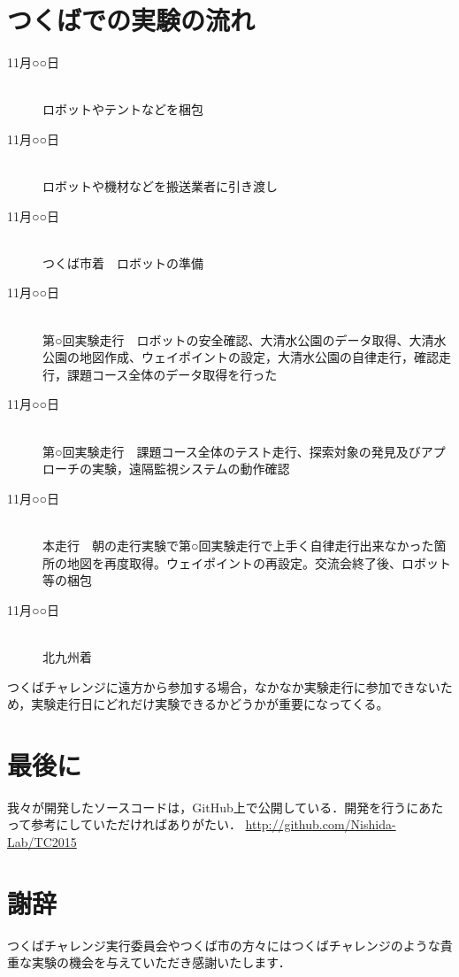\documentclass[10pt,a4paper]{jarticle}
\begin{document}
\section{つくばでの実験の流れ}
\begin{description}
 \item[11月○○日]\mbox{}\\
	    ロボットやテントなどを梱包
 \item[11月○○日]\mbox{}\\
	    ロボットや機材などを搬送業者に引き渡し
 \item[11月○○日]\mbox{}\\
	    つくば市着　ロボットの準備
 \item[11月○○日]\mbox{}\\
	    第○回実験走行　ロボットの安全確認、大清水公園のデータ取得、大清水公園の地図作成、ウェイポイントの設定，大清水公園の自律走行，確認走行，課題コース全体のデータ取得を行った
 \item[11月○○日]\mbox{}\\
	    第○回実験走行　課題コース全体のテスト走行、探索対象の発見及びアプローチの実験，遠隔監視システムの動作確認
 \item[11月○○日]\mbox{}\\
	    本走行　朝の走行実験で第○回実験走行で上手く自律走行出来なかった箇所の地図を再度取得。ウェイポイントの再設定。交流会終了後、ロボット等の梱包
 \item[11月○○日]\mbox{}\\
	    北九州着
\end{description}
つくばチャレンジに遠方から参加する場合，なかなか実験走行に参加できないため，実験走行日にどれだけ実験できるかどうかが重要になってくる。

\section{最後に}
我々が開発したソースコードは，GitHub上で公開している．開発を行うにあたって参考にしていただければありがたい．
\url{http://github.com/Nishida-Lab/TC2015}

\section*{謝辞}
つくばチャレンジ実行委員会やつくば市の方々にはつくばチャレンジのような貴重な実験の機会を与えていただき感謝いたします．



 

\end{document}
